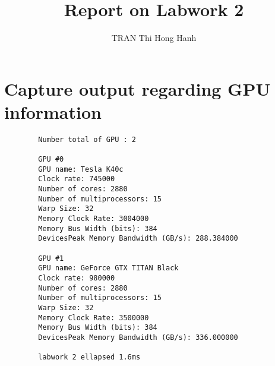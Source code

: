 \documentclass{article}
\title{Report on Labwork 2}
\author{TRAN Thi Hong Hanh}
\begin{document}
\maketitle
\section{Capture output regarding GPU information}
    \begin{verbatim}
        Number total of GPU : 2

        GPU #0
        GPU name: Tesla K40c
        Clock rate: 745000
        Number of cores: 2880
        Number of multiprocessors: 15
        Warp Size: 32
        Memory Clock Rate: 3004000
        Memory Bus Width (bits): 384
        DevicesPeak Memory Bandwidth (GB/s): 288.384000
        
        GPU #1
        GPU name: GeForce GTX TITAN Black
        Clock rate: 980000
        Number of cores: 2880
        Number of multiprocessors: 15
        Warp Size: 32
        Memory Clock Rate: 3500000
        Memory Bus Width (bits): 384
        DevicesPeak Memory Bandwidth (GB/s): 336.000000
        
        labwork 2 ellapsed 1.6ms

    \end{verbatim}
\end{document}
